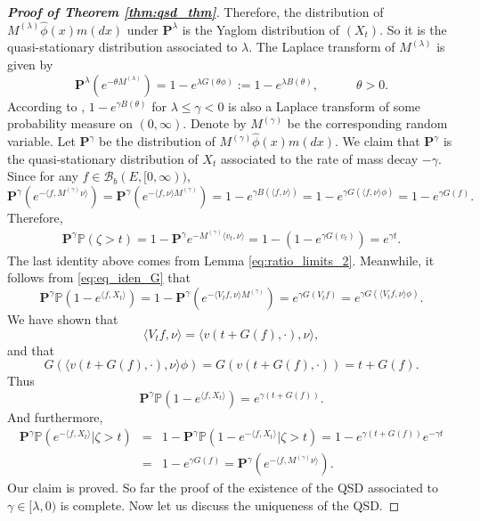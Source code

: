 \documentclass[12pt,a4paper]{amsart}
\numberwithin{equation}{section}
\theoremstyle{plain}
\theoremstyle{definition}
\begin{document}
\begin{proof}[{\bf Proof of Theorem \ref{thm:qsd_thm}}]
  Therefore, the distribution of $M^{(\lambda)}\widehat\phi(x)m(dx)$ under $\mathbf P^{\lambda }$ is the Yaglom distribution of $(X_t)$.  So it is the quasi-stationary distribution associated to $\lambda$.  The Laplace transform of $M^{(\lambda)}$ is given by
  \begin{equation}\label{eq:def_of_Y}
    \mathbf P^{\lambda}(e^{-\theta M^{(\lambda)}})=1-e^{\lambda G(\theta\phi)}:=1-e^{\lambda B(\theta)},\qquad\quad\theta>0.
  \end{equation}
  According to \cite[Lemma $3.2$]{Lambert2007Quasistationary}, $1-e^{\gamma B(\theta)}$ for $\lambda\leq \gamma<0$ is also a Laplace transform of some probability measure on $(0,\infty)$.  Denote by $M^{(\gamma)}$ be the corresponding random variable.  Let $\mathbf P^{\gamma}$ be the distribution of $M^{(\gamma)}\widehat\phi(x)m(dx)$.  We claim that $\mathbf P^{\gamma}$ is the quasi-stationary distribution of $X_t$ associated to the rate of mass decay $-\gamma$.  Since for any $f\in\mathcal B_b(E,[0,\infty))$,
  \[
    \mathbf P^{\gamma}(e^{-\langle f,M^{(\gamma)}\nu\rangle })=\mathbf P^{\gamma}(e^{-\langle f,\nu\rangle M^{(\gamma)}})=1-e^{\gamma B(\langle f,\nu\rangle )}=1-e^{\gamma G(\langle f,\nu\rangle \phi)}=1-e^{\gamma G(f)}.
  \]
  Therefore,
  \begin{eqnarray*}
    \mathbf P^{\gamma}\mathbb P(\zeta>t)=1-\mathbf P^{\gamma}e^{-M^{(\gamma)}\langle v_t,\nu\rangle }=1-(1-e^{\gamma G(v_t)})=e^{\gamma t}.
  \end{eqnarray*}
  The last identity above comes from Lemma \ref{eq:ratio_limits_2}. Meanwhile, it follows from \eqref{eq:eq_iden_G} that
  \[
    \mathbf P^{\gamma}\mathbb P\left(1-e^{\langle f, X_t\rangle }\right)=1-\mathbf P^{\gamma}\left(e^{-\langle V_tf,\nu\rangle M^{(\gamma)}}\right)
    =e^{\gamma G(V_tf)}=e^{\gamma G(\langle V_tf,\nu\rangle\phi)}.
  \]
  We have shown that
  \begin{equation}\label{eq:ident_Vv}
    \langle V_tf,\nu\rangle =\langle v(t+G(f),\cdot),\nu\rangle,
  \end{equation}
  and that
  \begin{equation}\label{eq:ident_Gv}
    G(\langle v(t+G(f),\cdot),\nu\rangle \phi)=G(v(t+G(f),\cdot))=t+G(f).
  \end{equation}
  Thus
  \[
    \mathbf P^{\gamma}\mathbb P\left(1-e^{\langle f, X_t\rangle }\right)=e^{\gamma(t+G(f))}.
  \]
  And furthermore,
  \begin{eqnarray*}
    \mathbf P^{\gamma}\mathbb P\left(e^{-\langle f, X_t\rangle }\big|\zeta>t\right)&=&1-\mathbf P^{\gamma}\mathbb P\left(1-e^{-\langle f, X_t\rangle }\big|\zeta>t\right)=1-e^{\gamma(t+G(f))}e^{-\gamma t}\\
                                                                                   &=&1-e^{\gamma G(f)}=\mathbf P^{\gamma}(e^{-\langle f,M^{(\gamma)}\nu\rangle }).
  \end{eqnarray*}
  Our claim is proved.  So far the proof of the existence of the QSD associated to $\gamma\in[\lambda,0)$ is complete.  Now let us discuss the uniqueness of the QSD.


\end{proof}
\end{document}
